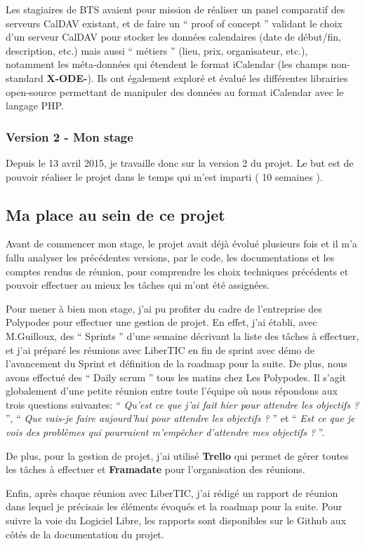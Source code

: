 Les stagiaires de BTS avaient pour mission de réaliser un panel comparatif des serveurs CalDAV existant, et de faire un `` proof of concept '' validant le choix d'un serveur CalDAV pour stocker les données calendaires (date de début/fin, description, etc.) mais aussi `` métiers '' (lieu, prix, organisateur, etc.), notamment les méta-données qui étendent le format iCalendar (les champs non-standard \textbf{X-ODE-}). Ils ont également exploré et évalué les différentes librairies open-source permettant de manipuler des données au format iCalendar avec le langage PHP.

\subsubsection*{Version 2 - Mon stage}

Depuis le 13 avril 2015, je travaille donc sur la version 2 du projet. Le but est de pouvoir réaliser le projet dans le temps qui m'est imparti ( 10 semaines ).

\subsection{Ma place au sein de ce projet}

Avant de commencer mon stage, le projet avait déjà évolué plusieurs fois et il m'a fallu analyser les précédentes versions, par le code, les documentations et les comptes rendus de réunion, pour comprendre les choix techniques précédents et pouvoir effectuer au mieux les tâches qui m'ont été assignées.

Pour mener à bien mon stage, j'ai pu profiter du cadre de l'entreprise des Polypodes pour effectuer une gestion de projet. En effet, j'ai établi, avec M.Guilloux, des `` Sprints '' d'une semaine décrivant la liste des tâches à effectuer, et j'ai préparé les réunions avec LiberTIC en fin de sprint avec démo de l'avancement du Sprint et définition de la roadmap pour la suite. De plus, nous avons effectué des `` Daily scrum '' tous les matins chez Les Polypodes. Il s'agit globalement d'une petite réunion entre toute l'équipe où nous répondons aux trois questions suivantes: `` \textit{Qu'est ce que j'ai fait hier pour attendre les objectifs ?} '', `` \textit{Que vais-je faire aujourd'hui pour attendre les objectifs ?} '' et `` \textit{Est ce que je vois des problèmes qui pourraient m'empêcher d'attendre mes objectifs ?} ''.

De plus, pour la gestion de projet, j'ai utilisé \textbf{Trello} qui permet de gérer toutes les tâches à effectuer et \textbf{Framadate} pour l'organisation des réunions.

Enfin, après chaque réunion avec LiberTIC, j'ai rédigé un rapport de réunion dans lequel je précisais les éléments évoqués et la roadmap pour la suite. Pour suivre la voie du Logiciel Libre, les rapports sont disponibles sur le Github aux côtés de la documentation du projet.
